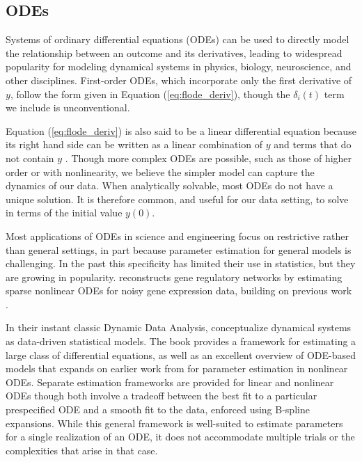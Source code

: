 \documentclass[preprint]{JASA}
\begin{document}
\hypertarget{odes}{%
\subsection{ODEs}\label{odes}}

\label{sec:odes}

Systems of ordinary differential equations (ODEs) can be used to
directly model the relationship between an outcome and its derivatives,
leading to widespread popularity for modeling dynamical systems in
physics, biology, neuroscience, and other disciplines. First-order ODEs,
which incorporate only the first derivative of \(y\), follow the form
given in Equation (\ref{eq:flode_deriv}), though the \(\delta_i(t)\)
term we include is unconventional.

Equation (\ref{eq:flode_deriv}) is also said to be a linear differential
equation because its right hand side can be written as a linear
combination of \(y\) and terms that do not contain \(y\)
\citep{tennenbaum1985}. Though more complex ODEs are possible, such as
those of higher order or with nonlinearity, we believe the simpler model
can capture the dynamics of our data. When analytically solvable, most
ODEs do not have a unique solution. It is therefore common, and useful
for our data setting, to solve in terms of the initial value \(y(0)\).

Most applications of ODEs in science and engineering focus on
restrictive rather than general settings, in part because parameter
estimation for general models is challenging. In the past this
specificity has limited their use in statistics, but they are growing in
popularity. \cite{chen2017} reconstructs gene regulatory networks by
estimating sparse nonlinear ODEs for noisy gene expression data,
building on previous work \citep{lu2011, henderson2014}.

In their instant classic Dynamic Data Analysis, \cite{ramsay2017}
conceptualize dynamical systems as data-driven statistical models. The
book provides a framework for estimating a large class of differential
equations, as well as an excellent overview of ODE-based models that
expands on earlier work from \cite{ramsay2007} for parameter estimation
in nonlinear ODEs. Separate estimation frameworks are provided for
linear and nonlinear ODEs though both involve a tradeoff between the
best fit to a particular prespecified ODE and a smooth fit to the data,
enforced using B-spline expansions. While this general framework is
well-suited to estimate parameters for a single realization of an ODE,
it does not accommodate multiple trials or the complexities that arise
in that case.
\end{document}
